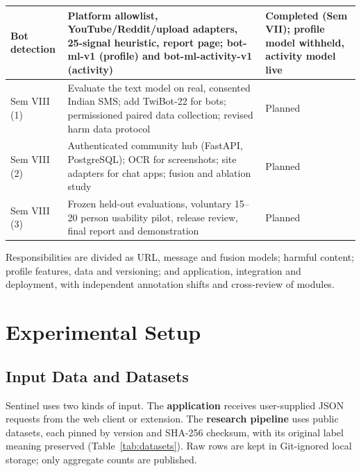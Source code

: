 \begin{table}[!htbp]
\begin{tabular}{|>{\raggedright\arraybackslash}p{2.3cm}|>{\raggedright\arraybackslash}p{8.9cm}|>{\raggedright\arraybackslash}p{3.0cm}|}
Bot detection & Platform allowlist, YouTube/Reddit/upload adapters, 25-signal heuristic, report page; bot-ml-v1 (profile) and bot-ml-activity-v1 (activity) & Completed (Sem VII); profile model withheld, activity model live \\ \hline
Sem VIII (1) & Evaluate the text model on real, consented Indian SMS; add TwiBot-22 for bots; permissioned paired data collection; revised harm data protocol & Planned \\ \hline
Sem VIII (2) & Authenticated community hub (FastAPI, PostgreSQL); OCR for screenshots; site adapters for chat apps; fusion and ablation study & Planned \\ \hline
Sem VIII (3) & Frozen held-out evaluations, voluntary 15--20 person usability pilot, release review, final report and demonstration & Planned \\ \hline
\end{tabular}
\end{table}

\noindent Responsibilities are divided as URL, message and fusion models; harmful content; profile features, data and versioning; and application, integration and deployment, with independent annotation shifts and cross-review of modules.

\section{Experimental Setup}
\subsection{Input Data and Datasets}
\noindent Sentinel uses two kinds of input. The \textbf{application} receives user-supplied JSON requests from the web client or extension. The \textbf{research pipeline} uses public datasets, each pinned by version and SHA-256 checksum, with its original label meaning preserved (Table~\ref{tab:datasets}). Raw rows are kept in Git-ignored local storage; only aggregate counts are published.

